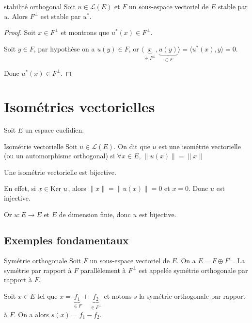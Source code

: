\begin{theoreme}{stabilité orthogonal}{}
    Soit $u \in \mathscr L(E)$ et $F$ un sous-espace vectoriel de $E$ stable par $u$. 
    Alors $F^\perp$ est stable par $u^*$.
\end{theoreme}

\begin{proof}
    Soit $x \in F^\perp$ et montrons que $u^*(x) \in F^\perp$. 

    Soit $y \in F$, par hypothèse on a $u(y) \in F$, or $\langle \underbrace{x}_{\in F^\perp}, \underbrace{u(y)}_{\in F} \rangle = \langle u^*(x), y \rangle  = 0$.

    Donc $u^*(x) \in F^\perp$. 
\end{proof}

\section{Isométries vectorielles}

Soit $E$ un espace euclidien.

\begin{definition}{Isométrie vectorielle}{}
    Soit $u \in \mathscr L(E)$. On dit que $u$ est une isométrie vectorielle (ou un automorphisme 
    orthogonal) si $\forall x \in E$, $\| u(x) \| = \| x \|$ 
\end{definition}

\begin{remarque}
    Une isométrie vectorielle est bijective. 

    En effet, si $x \in \operatorname{Ker} \, u$, alors $\| x \| = \| u(x) \| = 0$ et $x = 0$. Donc $u$ est injective.

    Or $u : E \to E$ et $E$ de dimension finie, donc $u$ est bijective. 
\end{remarque}

\subsection{Exemples fondamentaux}

\begin{definition}{Symétrie orthogonale}{}
    Soit $F$ un sous-espace vectoriel de $E$. On a $E = F \oplus F^\perp$.
    La symétrie par rapport à $F$ parallèlement à $F^\perp$ est appelée 
    symétrie orthogonale par rapport à $F$. 
\end{definition}


Soit $x \in E$ tel que $x = \underbrace{f_1}_{\in F} + \underbrace{f_2}_{\in F^\perp}$
et notons $s$ la symétrie orthogonale par rapport à $F$. 
On a alors $s(x) = f_1 - f_2$.

